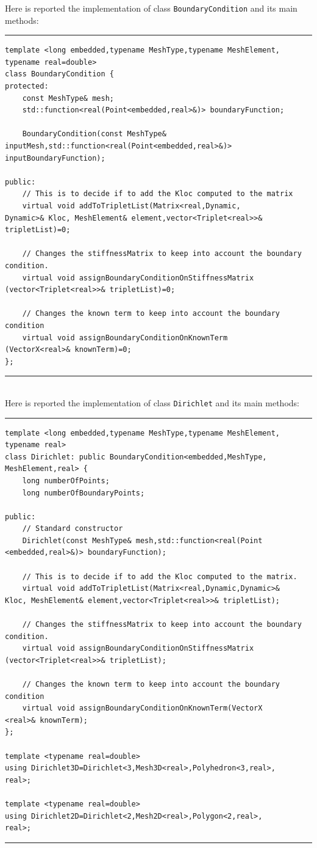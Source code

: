 Here is reported the implementation of class \verb|BoundaryCondition| and its main methods:

\noindent\rule{12.7cm}{1pt}
\begin{lstlisting}[caption=File \texttt{BoundaryCondition.h}]
template <long embedded,typename MeshType,typename MeshElement,
typename real=double>
class BoundaryCondition {
protected:
    const MeshType& mesh;
    std::function<real(Point<embedded,real>&)> boundaryFunction;

    BoundaryCondition(const MeshType&
inputMesh,std::function<real(Point<embedded,real>&)> 
inputBoundaryFunction);

public:
    // This is to decide if to add the Kloc computed to the matrix
    virtual void addToTripletList(Matrix<real,Dynamic,
Dynamic>& Kloc, MeshElement& element,vector<Triplet<real>>& 
tripletList)=0;
	
    // Changes the stiffnessMatrix to keep into account the boundary condition.
    virtual void assignBoundaryConditionOnStiffnessMatrix
(vector<Triplet<real>>& tripletList)=0;
	
    // Changes the known term to keep into account the boundary condition
    virtual void assignBoundaryConditionOnKnownTerm
(VectorX<real>& knownTerm)=0; 		
};

\end{lstlisting}

\noindent\rule{12.7cm}{1pt}\\

Here is reported the implementation of class \verb|Dirichlet| and its main methods:

\noindent\rule{12.7cm}{1pt}
\begin{lstlisting}[caption=File \texttt{Dirichlet.h}]
template <long embedded,typename MeshType,typename MeshElement,
typename real>
class Dirichlet: public BoundaryCondition<embedded,MeshType,
MeshElement,real> {
    long numberOfPoints;
    long numberOfBoundaryPoints;

public:
    // Standard constructor
    Dirichlet(const MeshType& mesh,std::function<real(Point
<embedded,real>&)> boundaryFunction);
	
    // This is to decide if to add the Kloc computed to the matrix.
    virtual void addToTripletList(Matrix<real,Dynamic,Dynamic>& 
Kloc, MeshElement& element,vector<Triplet<real>>& tripletList);
	
    // Changes the stiffnessMatrix to keep into account the boundary condition.
    virtual void assignBoundaryConditionOnStiffnessMatrix
(vector<Triplet<real>>& tripletList);
	
    // Changes the known term to keep into account the boundary condition
    virtual void assignBoundaryConditionOnKnownTerm(VectorX
<real>& knownTerm);	
};

template <typename real=double>
using Dirichlet3D=Dirichlet<3,Mesh3D<real>,Polyhedron<3,real>,
real>;

template <typename real=double>
using Dirichlet2D=Dirichlet<2,Mesh2D<real>,Polygon<2,real>,
real>;
\end{lstlisting}
\noindent\rule{12.7cm}{1pt}\\

